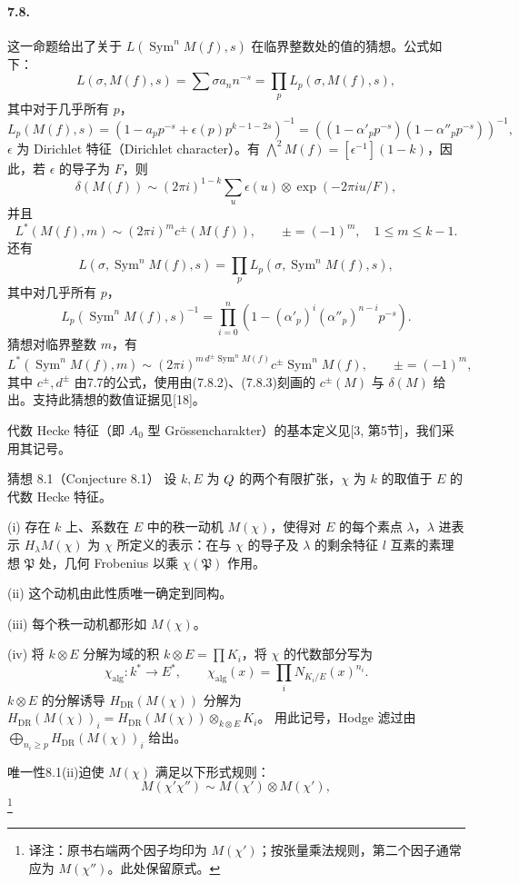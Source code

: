 \paragraph*{7.8.}
这一命题给出了关于 $L(\operatorname{Sym}^nM(f),s)$ 在临界整数处的值的猜想。公式如下：
\[
 L(\sigma,M(f),s)=\sum\sigma a_nn^{-s}
 =\prod_pL_p(\sigma,M(f),s),\tag{7.8.1}
\]
其中对于几乎所有 $p$，
\[
 L_p(M(f),s)=(1-a_pp^{-s}+\epsilon(p)p^{k-1-2s})^{-1}
 =((1-\alpha'_pp^{-s})(1-\alpha''_pp^{-s}))^{-1},
\]
$\epsilon$ 为 Dirichlet 特征（Dirichlet character）。有 $\bigwedge^2M(f)=[\epsilon^{-1}](1-k)$，因此，若 $\epsilon$ 的导子为 $F$，则
\[
 \delta(M(f))\sim(2\pi i)^{1-k}
 \sum_u\epsilon(u)\otimes\exp(-2\pi iu/F),\tag{7.8.2}
\]
并且
\[
 L^*(M(f),m)\sim(2\pi i)^m c^\pm(M(f)),\qquad
 \pm=(-1)^m,\quad1\leq m\leq k-1.\tag{7.8.3}
\]
还有
\[
 L(\sigma,\operatorname{Sym}^nM(f),s)
 =\prod_pL_p(\sigma,\operatorname{Sym}^nM(f),s),\tag{7.8.4}
\]
其中对几乎所有 $p$，
\[
 L_p(\operatorname{Sym}^nM(f),s)^{-1}
 =\prod_{i=0}^n(1-(\alpha'_p)^i(\alpha''_p)^{n-i}p^{-s}).
\]
猜想对临界整数 $m$，有
\[
 L^*(\operatorname{Sym}^nM(f),m)
 \sim(2\pi i)^{m\,d^\pm\operatorname{Sym}^nM(f)}
 c^\pm\operatorname{Sym}^nM(f),\qquad\pm=(-1)^m,
\]
其中 $c^\pm,d^\pm$ 由7.7的公式，使用由(7.8.2)、(7.8.3)刻画的 $c^\pm(M)$ 与 $\delta(M)$ 给出。支持此猜想的数值证据见[18]。

代数 Hecke 特征（即 $A_0$ 型 Grössencharakter）的基本定义见[3, 第5节]，我们采用其记号。

\begin{originaltheorem}{猜想 8.1（Conjecture 8.1）}
设 $k,E$ 为 $Q$ 的两个有限扩张，$\chi$ 为 $k$ 的取值于 $E$ 的代数 Hecke 特征。

(i) 存在 $k$ 上、系数在 $E$ 中的秩一动机 $M(\chi)$，使得对 $E$ 的每个素点 $\lambda$，$\lambda$ 进表示 $H_\lambda M(\chi)$ 为 $\chi$ 所定义的表示：在与 $\chi$ 的导子及 $\lambda$ 的剩余特征 $l$ 互素的素理想 $\mathfrak P$ 处，几何 Frobenius 以乘 $\chi(\mathfrak P)$ 作用。

(ii) 这个动机由此性质唯一确定到同构。

(iii) 每个秩一动机都形如 $M(\chi)$。

(iv) 将 $k\otimes E$ 分解为域的积 $k\otimes E=\prod K_i$，将 $\chi$ 的代数部分写为
\[
 \chi_{\mathrm{alg}}:k^*\longrightarrow E^*,\qquad
 \chi_{\mathrm{alg}}(x)=\prod_i N_{K_i/E}(x)^{n_i}.
\]
$k\otimes E$ 的分解诱导 $H_{\mathrm{DR}}(M(\chi))$ 分解为
$H_{\mathrm{DR}}(M(\chi))_i=H_{\mathrm{DR}}(M(\chi))\otimes_{k\otimes E}K_i$。
用此记号，Hodge 滤过由 $\bigoplus_{n_i\geq p}H_{\mathrm{DR}}(M(\chi))_i$ 给出。
\end{originaltheorem}
唯一性8.1(ii)迫使 $M(\chi)$ 满足以下形式规则：
\[
 M(\chi'\chi'')\sim M(\chi')\otimes M(\chi'),\tag{8.1.1}
\]\footnote{译注：原书右端两个因子均印为 $M(\chi')$；按张量乘法规则，第二个因子通常应为 $M(\chi'')$。此处保留原式。}
